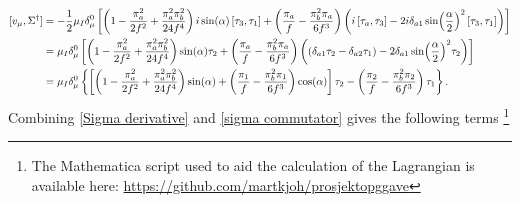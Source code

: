 \documentclass{article}
\begin{document}
\begin{align}
    \notag
    [v_\mu, \Sigma^\dagger] & = - 
    \frac{1}{2} \mu_I \delta^0_\mu
    \left[
        \left(
            1 
            - \frac{\pi_a^2}{2f^2}
            + \frac{\pi_a^2\pi_b^2}{24f^4}
        \right)
        i \sin(\alpha) \left[\tau_3, \tau_1 \right]
        + 
        \left(
            \frac{\pi_a}{f} 
            - \frac{\pi_b^2\pi_a}{6f^3} 
        \right)
        \left(
            i\left[\tau_a, \tau_3 \right] 
            - 2i\delta_{a1}\sin(\frac{\alpha}{2})^2\left[\tau_3, \tau_1 \right]
        \right)
    \right] \\
    \notag
    & =
    \mu_I \delta^0_\mu
    \left[
        \left(
            1 
            - \frac{\pi_a^2}{2f^2}
            + \frac{\pi_a^2\pi_b^2}{24f^4}
        \right)
        \sin(\alpha) \tau_2
        + 
        \left(
            \frac{\pi_a}{f} 
            - \frac{\pi_b^2\pi_a}{6f^3} 
        \right)
        \left(
            (\delta_{a1}\tau_2-\delta_{a2}\tau_1)
            - 2\delta_{a1}\sin(\frac{\alpha}{2})^2 \tau_2
        \right)
    \right] \\
    & =
    \mu_I \delta^0_\mu
    \left\{
        \left[
        \left(
            1 
            - \frac{\pi_a^2}{2f^2}
            + \frac{\pi_a^2\pi_b^2}{24f^4}
        \right)
        \sin(\alpha)
        + 
        \left(
            \frac{\pi_1}{f} 
            - \frac{\pi_b^2\pi_1}{6f^3} 
        \right) \cos(\alpha)
        \right]
         \tau_2
        -
        \left(
            \frac{\pi_2}{f} 
            - \frac{\pi_b^2\pi_2}{6f^3} 
        \right)
        \tau_1
    \right\}.
    \label{sigma commutator}
\end{align}
Combining \autoref{Sigma derivative} and \autoref{sigma commutator} gives the following terms \footnote{The Mathematica script used to aid the calculation of the Lagrangian is available here: \url{https://github.com/martkjoh/prosjektopggave}}
\end{document}
